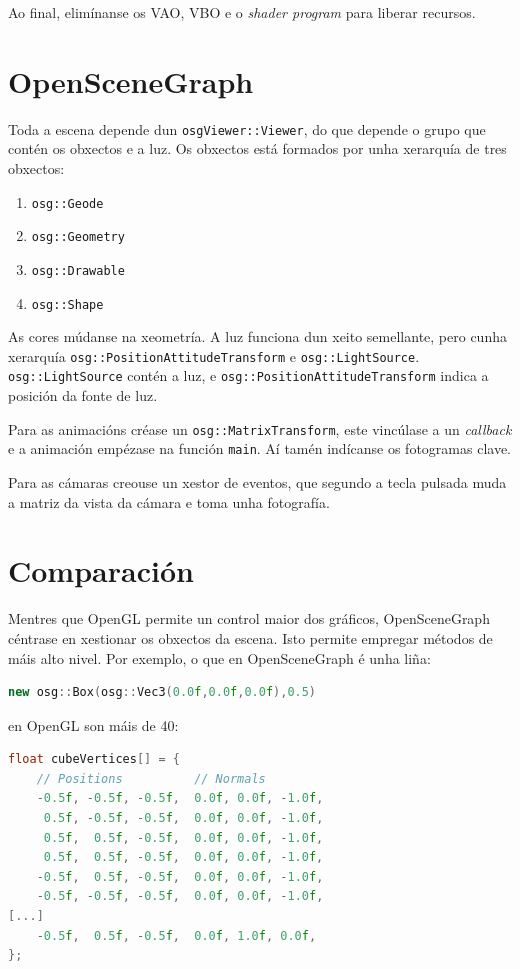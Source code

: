 \documentclass{article}
\begin{document}
Ao final, elimínanse os VAO, VBO e o \textit{shader program} para liberar recursos.

\section{OpenSceneGraph}

Toda a escena depende dun \texttt{osgViewer::Viewer}, do que depende o grupo que contén os obxectos e a luz. Os obxectos está formados por unha xerarquía de tres obxectos:

\begin{enumerate}
\item \texttt{osg::Geode}
\item \texttt{osg::Geometry}
\item \texttt{osg::Drawable}
\item \texttt{osg::Shape}
\end{enumerate}

As cores múdanse na xeometría. A luz funciona dun xeito semellante, pero cunha xerarquía \texttt{osg::PositionAttitudeTransform} e \texttt{osg::LightSource}. \texttt{osg::LightSource} contén a luz, e \texttt{osg::PositionAttitudeTransform} indica a posición da fonte de luz.

Para as animacións créase un \texttt{osg::MatrixTransform}, este vincúlase a un \textit{callback} e a animación empézase na función \texttt{main}. Aí tamén indícanse os fotogramas clave.

Para as cámaras creouse un xestor de eventos, que segundo a tecla pulsada muda a matriz da vista da cámara e toma unha fotografía.

\section{Comparación}

Mentres que OpenGL permite un control maior dos gráficos, OpenSceneGraph céntrase en xestionar os obxectos da escena. Isto permite empregar métodos de máis alto nivel. Por exemplo, o que en OpenSceneGraph é unha liña:

\begin{lstlisting}[language=C++]
new osg::Box(osg::Vec3(0.0f,0.0f,0.0f),0.5)
\end{lstlisting}

en OpenGL son máis de 40:

\begin{lstlisting}[language=C++]
float cubeVertices[] = {
    // Positions          // Normals
    -0.5f, -0.5f, -0.5f,  0.0f, 0.0f, -1.0f,
     0.5f, -0.5f, -0.5f,  0.0f, 0.0f, -1.0f,
     0.5f,  0.5f, -0.5f,  0.0f, 0.0f, -1.0f,
     0.5f,  0.5f, -0.5f,  0.0f, 0.0f, -1.0f,
    -0.5f,  0.5f, -0.5f,  0.0f, 0.0f, -1.0f,
    -0.5f, -0.5f, -0.5f,  0.0f, 0.0f, -1.0f,
[...]
    -0.5f,  0.5f, -0.5f,  0.0f, 1.0f, 0.0f,
};
\end{lstlisting}
\end{document}
